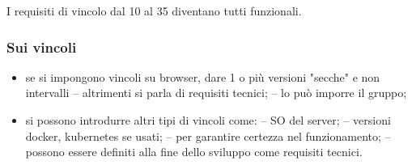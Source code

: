     I requisiti di vincolo dal 10 al 35 diventano tutti funzionali.

    \subsubsection{Sui vincoli}
        \begin{itemize}
            \item se si impongono vincoli su browser, dare 1 o più versioni "secche" e non intervalli
                \subitem -- altrimenti si parla di requisiti tecnici;
                \subitem -- lo può imporre il gruppo;
            \item si possono introdurre altri tipi di vincoli come:
                \subitem -- SO del server;
                \subitem -- versioni docker, kubernetes se usati;
                \subitem -- per garantire certezza nel funzionamento;
                \subitem -- possono essere definiti alla fine dello sviluppo come requisiti tecnici.
        \end{itemize}

\pagebreak
